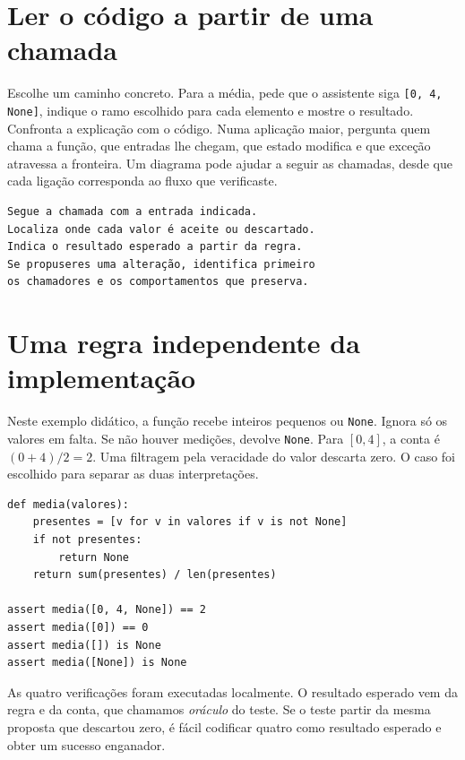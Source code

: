 \section{Ler o código a partir de uma chamada}

Escolhe um caminho concreto. Para a média, pede que o assistente siga \texttt{[0, 4, None]}, indique o ramo escolhido para cada elemento e mostre o resultado. Confronta a explicação com o código. Numa aplicação maior, pergunta quem chama a função, que entradas lhe chegam, que estado modifica e que exceção atravessa a fronteira. Um diagrama pode ajudar a seguir as chamadas, desde que cada ligação corresponda ao fluxo que verificaste.

\begin{lstlisting}
Segue a chamada com a entrada indicada.
Localiza onde cada valor é aceite ou descartado.
Indica o resultado esperado a partir da regra.
Se propuseres uma alteração, identifica primeiro
os chamadores e os comportamentos que preserva.
\end{lstlisting}

\section{Uma regra independente da implementação}

Neste exemplo didático, a função recebe inteiros pequenos ou \texttt{None}. Ignora só os valores em falta. Se não houver medições, devolve \texttt{None}. Para $[0,4]$, a conta é $(0+4)/2=2$. Uma filtragem pela veracidade do valor descarta zero. O caso foi escolhido para separar as duas interpretações.

\begin{lstlisting}
def media(valores):
    presentes = [v for v in valores if v is not None]
    if not presentes:
        return None
    return sum(presentes) / len(presentes)

assert media([0, 4, None]) == 2
assert media([0]) == 0
assert media([]) is None
assert media([None]) is None
\end{lstlisting}

As quatro verificações foram executadas localmente. O resultado esperado vem da regra e da conta, que chamamos \emph{oráculo} do teste. Se o teste partir da mesma proposta que descartou zero, é fácil codificar quatro como resultado esperado e obter um sucesso enganador.

